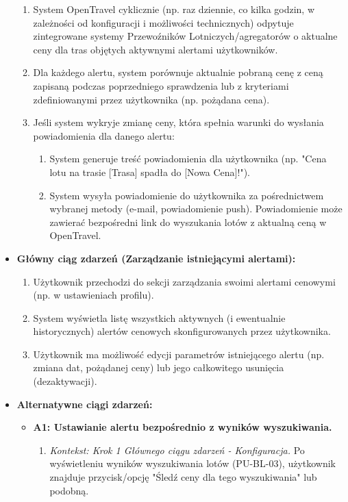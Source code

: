 \documentclass[a4paper,12pt]{article}
\begin{document}
\begin{itemize}
        \begin{enumerate}
            \item System OpenTravel cyklicznie (np. raz dziennie, co kilka godzin, w zależności od konfiguracji i możliwości technicznych) odpytuje zintegrowane systemy Przewoźników Lotniczych/agregatorów o aktualne ceny dla tras objętych aktywnymi alertami użytkowników.
            \item Dla każdego alertu, system porównuje aktualnie pobraną cenę z ceną zapisaną podczas poprzedniego sprawdzenia lub z kryteriami zdefiniowanymi przez użytkownika (np. pożądana cena).
            \item Jeśli system wykryje zmianę ceny, która spełnia warunki do wysłania powiadomienia dla danego alertu:
                \begin{enumerate}
                    \item System generuje treść powiadomienia dla użytkownika (np. "Cena lotu na trasie [Trasa] spadła do [Nowa Cena]!").
                    \item System wysyła powiadomienie do użytkownika za pośrednictwem wybranej metody (e-mail, powiadomienie push). Powiadomienie może zawierać bezpośredni link do wyszukania lotów z aktualną ceną w OpenTravel.
                \end{enumerate}
        \end{enumerate}
    \item \textbf{Główny ciąg zdarzeń (Zarządzanie istniejącymi alertami):}
        \begin{enumerate}
            \item Użytkownik przechodzi do sekcji zarządzania swoimi alertami cenowymi (np. w ustawieniach profilu).
            \item System wyświetla listę wszystkich aktywnych (i ewentualnie historycznych) alertów cenowych skonfigurowanych przez użytkownika.
            \item Użytkownik ma możliwość edycji parametrów istniejącego alertu (np. zmiana dat, pożądanej ceny) lub jego całkowitego usunięcia (dezaktywacji).
        \end{enumerate}
    \item \textbf{Alternatywne ciągi zdarzeń:}
        \begin{itemize}
            \item \textbf{A1: Ustawianie alertu bezpośrednio z wyników wyszukiwania.}
                \begin{enumerate}
                    \item \textit{Kontekst: Krok 1 Głównego ciągu zdarzeń - Konfiguracja.} Po wyświetleniu wyników wyszukiwania lotów (PU-BL-03), użytkownik znajduje przycisk/opcję "Śledź ceny dla tego wyszukiwania" lub podobną.

\end{enumerate}
\end{itemize}
\end{itemize}
\end{document}
